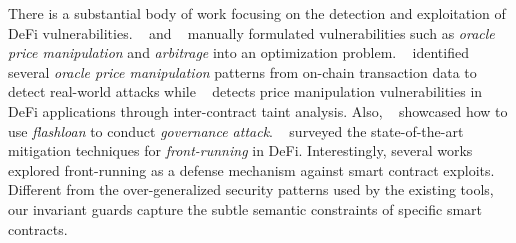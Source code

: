 
There is a substantial body of work focusing on the detection and exploitation of DeFi vulnerabilities. \citeauthor{qin2021attacking}~\cite{qin2021attacking} and \citeauthor{zhou2021just}~\cite{zhou2021just} manually formulated vulnerabilities such as \textit{oracle price manipulation} and \textit{arbitrage} into an optimization problem. 
\citeauthor{wu2021defiranger}~\cite{wu2021defiranger} identified several \textit{oracle price
manipulation} patterns from on-chain transaction data to detect real-world attacks while
\citeauthor{kong2023defitainter}~\cite{kong2023defitainter} detects price manipulation
vulnerabilities in DeFi applications through inter-contract taint analysis.
Also, \citeauthor{gudgeon2020decentralized}~\cite{gudgeon2020decentralized} showcased how to
use \textit{flashloan} to conduct \textit{governance attack}.
\citeauthor{baum2022sok}~\cite{baum2022sok} surveyed the state-of-the-art mitigation techniques for
\textit{front-running} in DeFi.
Interestingly, several works~\cite{xue2022preventing, deng2023robust, zhang2023your} explored
front-running as a defense mechanism against smart contract exploits.
Different from the over-generalized security patterns used by the existing tools,
our invariant guards capture the subtle semantic constraints of specific smart contracts.

